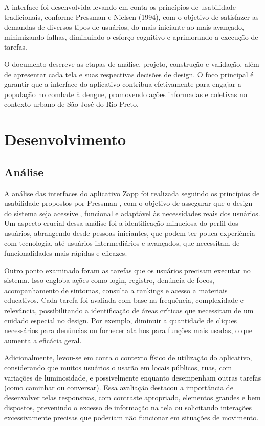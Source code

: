 \documentclass[a4paper, 12pt]{article}
\begin{document}
A interface foi desenvolvida levando em conta os princípios de usabilidade tradicionais, conforme Pressman \cite{pressman-2019} e Nielsen (1994), com o objetivo de satisfazer as demandas de diversos tipos de usuários, do mais iniciante ao mais avançado, minimizando falhas, diminuindo o esforço cognitivo e aprimorando a execução de tarefas. 
 
O documento descreve as etapas de análise, projeto, construção e validação, além de apresentar cada tela e suas respectivas decisões de design. O foco principal é garantir que a interface do aplicativo contribua efetivamente para engajar a população no combate à dengue, promovendo ações informadas e coletivas no contexto urbano de São José do Rio Preto.

\newpage
\section{Desenvolvimento}

\subsection{Análise}
A análise das interfaces do aplicativo Zapp foi realizada seguindo os princípios de usabilidade propostos por Pressman \cite{pressman-2019}, com o objetivo de assegurar que o design do sistema seja acessível, funcional e adaptável às necessidades reais dos usuários. Um aspecto crucial dessa análise foi a identificação minuciosa do perfil dos usuários, abrangendo desde pessoas iniciantes, que podem ter pouca experiência com tecnologia, até usuários intermediários e avançados, que necessitam de funcionalidades mais rápidas e eficazes.

Outro ponto examinado foram as tarefas que os usuários precisam executar no sistema. Isso engloba ações como login, registro, denúncia de focos, acompanhamento de sintomas, consulta a rankings e acesso a materiais educativos. Cada tarefa foi avaliada com base na frequência, complexidade e relevância, possibilitando a identificação de áreas críticas que necessitam de um cuidado especial no design. Por exemplo, diminuir a quantidade de cliques necessários para denúncias ou fornecer atalhos para funções mais usadas, o que aumenta a eficácia geral.

Adicionalmente, levou-se em conta o contexto físico de utilização do aplicativo, considerando que muitos usuários o usarão em locais públicos, ruas, com variações de luminosidade, e possivelmente enquanto desempenham outras tarefas (como caminhar ou conversar). Essa avaliação destacou a importância de desenvolver telas responsivas, com contraste apropriado, elementos grandes e bem dispostos, prevenindo o excesso de informação na tela ou solicitando interações excessivamente precisas que poderiam não funcionar em situações de movimento.
\end{document}
